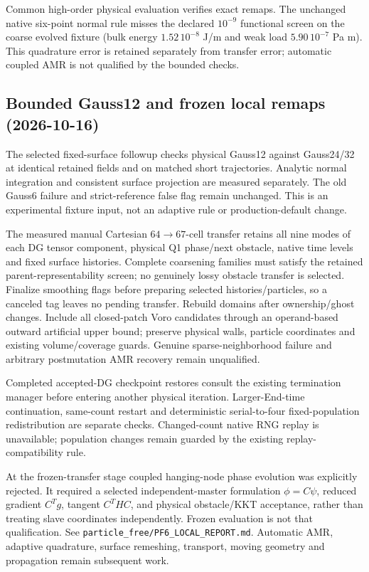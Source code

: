 \documentclass[11pt]{article}
\begin{document}
Common high-order physical evaluation verifies exact remaps. The unchanged
native six-point normal rule misses the declared $10^{-9}$ functional screen
on the coarse evolved fixture (bulk energy $1.52\,10^{-8}$ J/m and weak load
$5.90\,10^{-7}$ Pa m). This quadrature error is retained separately from transfer
error; automatic coupled AMR is not qualified by the bounded checks.

\subsection{Bounded Gauss12 and frozen local remaps (2026-10-16)}

The selected fixed-surface followup checks physical Gauss12 against Gauss24/32
at identical retained fields and on matched short trajectories. Analytic normal
integration and consistent surface projection are measured separately. The old
Gauss6 failure and strict-reference false flag remain unchanged. This is an
experimental fixture input, not an adaptive rule or production-default change.

The measured manual Cartesian $64\to67$-cell transfer retains all nine modes of
each DG tensor component, physical Q1 phase/next obstacle, native time levels and
fixed surface histories. Complete coarsening families must satisfy the retained
parent-representability screen; no genuinely lossy obstacle transfer is selected.
Finalize smoothing flags before preparing selected histories/particles, so a
canceled tag leaves no pending transfer. Rebuild domains after ownership/ghost
changes. Include all closed-patch Voro candidates through an operand-based outward
artificial upper bound; preserve physical walls, particle coordinates and existing
volume/coverage guards. Genuine sparse-neighborhood failure and arbitrary
postmutation AMR recovery remain unqualified.

Completed accepted-DG checkpoint restores consult the existing termination
manager before entering another physical iteration. Larger-End-time continuation,
same-count restart and deterministic serial-to-four fixed-population redistribution
are separate checks. Changed-count native RNG replay is unavailable; population
changes remain guarded by the existing replay-compatibility rule.

At the frozen-transfer stage coupled hanging-node phase evolution was explicitly
rejected. It required a selected independent-master formulation $\phi=C\psi$, reduced gradient $C^Tg$,
tangent $C^THC$, and physical obstacle/KKT acceptance, rather than treating slave
coordinates independently. Frozen evaluation is not that qualification.
See \texttt{particle\_free/PF6\_LOCAL\_REPORT.md}. Automatic AMR, adaptive
quadrature, surface remeshing, transport, moving geometry and propagation remain
subsequent work.
\end{document}
